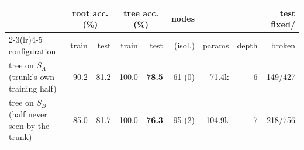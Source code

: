 \begin{tabular}{@{}lrrrrrrrr@{}}\toprule
 & \multicolumn{2}{c}{root acc. (\%)} & \multicolumn{2}{c}{tree acc. (\%)} & nodes & & & test fixed/\\
\cmidrule(lr){2-3}\cmidrule(lr){4-5}
configuration & train & test & train & test & (isol.) & params & depth & broken\\\midrule
tree on $S_A$ (trunk's own training half) & 90.2 & 81.2 & 100.0 & \textbf{78.5} & 61 (0) & 71.4k & 6 & 149/427\\
tree on $S_B$ (half never seen by the trunk) & 85.0 & 81.7 & 100.0 & \textbf{76.3} & 95 (2) & 104.9k & 7 & 218/756\\
\bottomrule\end{tabular}
